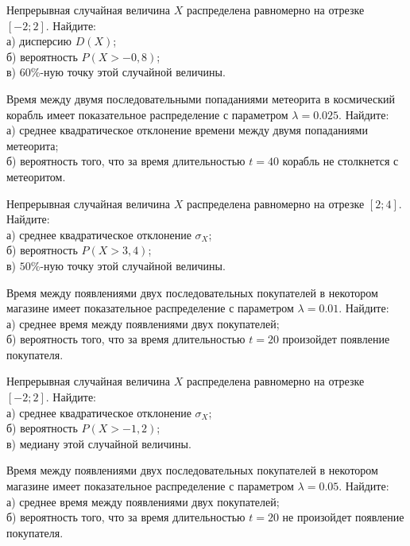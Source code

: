 

\z Непрерывная случайная величина $X$ распределена равномерно на отрезке $[-2; 2]$. Найдите: \\ \quad а) дисперсию $D(X)$; \\ \quad б) вероятность $P(X>-0{,}8)$; \\ \quad в) $60\%$-ную точку этой случайной величины.


\vfill

\z Время между двумя последовательными попаданиями метеорита в космический корабль имеет показательное распределение с параметром $\lambda = 0.025$. Найдите: \\ \quad а) среднее квадратическое отклонение времени между двумя попаданиями метеорита; \\ \quad б) вероятность того, что за время длительностью $t = 40$ корабль не столкнется с метеоритом.
 

\vfill

\newpage\setcounter{zad}{0}

\z Непрерывная случайная величина $X$ распределена равномерно на отрезке $[2; 4]$. Найдите: \\ \quad а) среднее квадратическое отклонение $\sigma_X$; \\ \quad б) вероятность $P(X>3{,}4)$; \\ \quad в) $50\%$-ную точку этой случайной величины.


\vfill

\z Время между появлениями двух последовательных покупателей в некотором магазине имеет показательное распределение с параметром $\lambda = 0.01$. Найдите: \\ \quad а) среднее время между появлениями двух покупателей; \\ \quad б) вероятность того, что за время длительностью $t = 20$  произойдет появление покупателя.
 

\vfill

\newpage\setcounter{zad}{0}

\z Непрерывная случайная величина $X$ распределена равномерно на отрезке $[-2; 2]$. Найдите: \\ \quad а) среднее квадратическое отклонение $\sigma_X$; \\ \quad б) вероятность $P(X>-1{,}2)$; \\ \quad в) медиану этой случайной величины.


\vfill

\z Время между появлениями двух последовательных покупателей в некотором магазине имеет показательное распределение с параметром $\lambda = 0.05$. Найдите: \\ \quad а) среднее время между появлениями двух покупателей; \\ \quad б) вероятность того, что за время длительностью $t = 20$ не произойдет появление покупателя.
 

